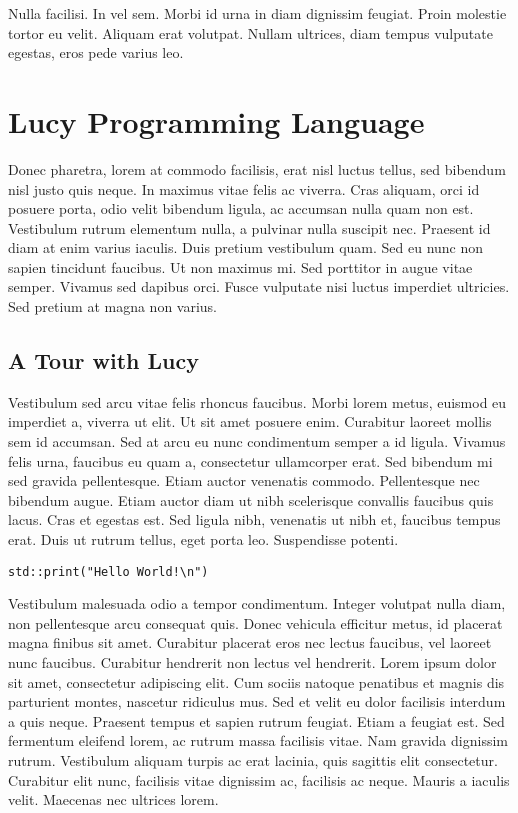 \begin{savequote}[75mm]
Nulla facilisi. In vel sem. Morbi id urna in diam dignissim feugiat. Proin molestie tortor eu velit. Aliquam erat volutpat. Nullam ultrices, diam tempus vulputate egestas, eros pede varius leo.
\end{savequote}

\chapter{Lucy Programming Language}
Donec pharetra, lorem at commodo facilisis, erat nisl luctus tellus, sed bibendum nisl justo quis neque. In maximus vitae felis ac viverra. Cras aliquam, orci id posuere porta, odio velit bibendum ligula, ac accumsan nulla quam non est. Vestibulum rutrum elementum nulla, a pulvinar nulla suscipit nec. Praesent id diam at enim varius iaculis. Duis pretium vestibulum quam. Sed eu nunc non sapien tincidunt faucibus. Ut non maximus mi. Sed porttitor in augue vitae semper. Vivamus sed dapibus orci. Fusce vulputate nisi luctus imperdiet ultricies. Sed pretium at magna non varius.


\section{A Tour with Lucy}
Vestibulum sed arcu vitae felis rhoncus faucibus. Morbi lorem metus, euismod eu imperdiet a, viverra ut elit. Ut sit amet posuere enim. Curabitur laoreet mollis sem id accumsan. Sed at arcu eu nunc condimentum semper a id ligula. Vivamus felis urna, faucibus eu quam a, consectetur ullamcorper erat. Sed bibendum mi sed gravida pellentesque. Etiam auctor venenatis commodo. Pellentesque nec bibendum augue. Etiam auctor diam ut nibh scelerisque convallis faucibus quis lacus. Cras et egestas est. Sed ligula nibh, venenatis ut nibh et, faucibus tempus erat. Duis ut rutrum tellus, eget porta leo. Suspendisse potenti.
\begin{lstlisting}[language=Lucy]
  std::print("Hello World!\n")
\end{lstlisting}
Vestibulum malesuada odio a tempor condimentum. Integer volutpat nulla diam, non pellentesque arcu consequat quis. Donec vehicula efficitur metus, id placerat magna finibus sit amet. Curabitur placerat eros nec lectus faucibus, vel laoreet nunc faucibus. Curabitur hendrerit non lectus vel hendrerit. Lorem ipsum dolor sit amet, consectetur adipiscing elit. Cum sociis natoque penatibus et magnis dis parturient montes, nascetur ridiculus mus. Sed et velit eu dolor facilisis interdum a quis neque. Praesent tempus et sapien rutrum feugiat. Etiam a feugiat est. Sed fermentum eleifend lorem, ac rutrum massa facilisis vitae. Nam gravida dignissim rutrum. Vestibulum aliquam turpis ac erat lacinia, quis sagittis elit consectetur. Curabitur elit nunc, facilisis vitae dignissim ac, facilisis ac neque. Mauris a iaculis velit. Maecenas nec ultrices lorem.

